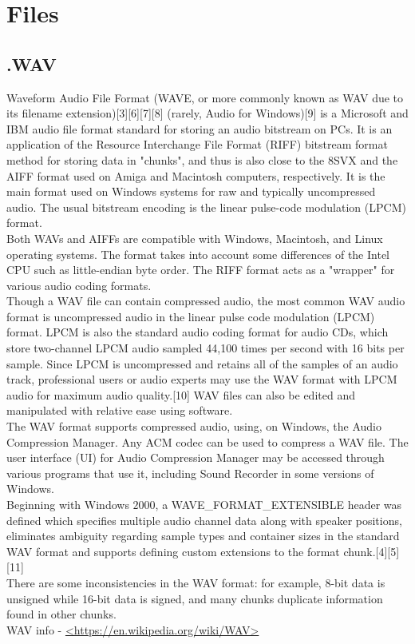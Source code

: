 \chapter{Files}\label{ch:ch4label}
\section{.WAV}

Waveform Audio File Format (WAVE, or more commonly known as WAV due to its filename extension)[3][6][7][8] (rarely, Audio for Windows)[9] is a Microsoft and IBM audio file format standard for storing an audio bitstream on PCs. It is an application of the Resource Interchange File Format (RIFF) bitstream format method for storing data in "chunks", and thus is also close to the 8SVX and the AIFF format used on Amiga and Macintosh computers, respectively. It is the main format used on Windows systems for raw and typically uncompressed audio. The usual bitstream encoding is the linear pulse-code modulation (LPCM) format.\\

Both WAVs and AIFFs are compatible with Windows, Macintosh, and Linux operating systems. The format takes into account some differences of the Intel CPU such as little-endian byte order. The RIFF format acts as a "wrapper" for various audio coding formats.\\
Though a WAV file can contain compressed audio, the most common WAV audio format is uncompressed audio in the linear pulse code modulation (LPCM) format. LPCM is also the standard audio coding format for audio CDs, which store two-channel LPCM audio sampled 44,100 times per second with 16 bits per sample. Since LPCM is uncompressed and retains all of the samples of an audio track, professional users or audio experts may use the WAV format with LPCM audio for maximum audio quality.[10] WAV files can also be edited and manipulated with relative ease using software.\\
The WAV format supports compressed audio, using, on Windows, the Audio Compression Manager. Any ACM codec can be used to compress a WAV file. The user interface (UI) for Audio Compression Manager may be accessed through various programs that use it, including Sound Recorder in some versions of Windows.\\
Beginning with Windows $2000$, a WAVE\_FORMAT\_EXTENSIBLE header was defined which specifies multiple audio channel data along with speaker positions, eliminates ambiguity regarding sample types and container sizes in the standard WAV format and supports defining custom extensions to the format chunk.[4][5][11]\\
There are some inconsistencies in the WAV format: for example, 8-bit data is unsigned while 16-bit data is signed, and many chunks duplicate information found in other chunks.\\

WAV info - \url{<https://en.wikipedia.org/wiki/WAV>}


